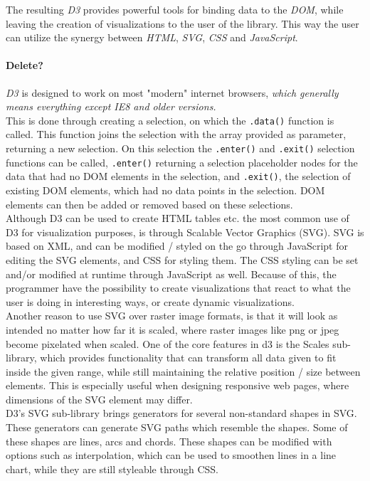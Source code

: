 \documentclass[Report.tex]{subfiles}
\begin{document}
	The resulting \emph{D3} provides powerful tools for binding data to the \emph{DOM}, while leaving the creation of visualizations to the user of the library. This way the user can utilize the synergy between \emph{HTML}, \emph{SVG}, \emph{CSS} and \emph{JavaScript}.
	
	\paragraph{Delete?\\}
	\emph{D3} is designed to work on most "modern" internet browsers, \textit{which generally means everything except IE8 and older versions.} \cite[Browser / Platform Support]{D3W}\\
	 This is done through creating a selection, on which the \texttt{.data()} function is called. This function joins the selection with the array provided as parameter, returning a new selection. On this selection the \texttt{.enter()} and \texttt{.exit()} selection functions can be called, \texttt{.enter()} returning a selection placeholder nodes for the data that had no DOM elements in the selection, and \texttt{.exit()}, the selection of existing DOM elements, which had no data points in the selection. DOM elements can then be added or removed based on these selections.\\
	Although D3 can be used to create HTML tables etc. the most common use of D3 for visualization purposes, is through Scalable Vector Graphics (SVG).
	SVG is based on XML, and can be modified / styled on the go through JavaScript for editing the SVG elements, and CSS for styling them. The CSS styling can be set and/or modified at runtime through JavaScript as well. Because of this, the programmer have the possibility to create visualizations that react to what the user is doing in interesting ways, or create dynamic visualizations.\\
	Another reason to use SVG over raster image formats, is that it will look as intended no matter how far it is scaled, where raster images like png or jpeg become pixelated when scaled.
	One of the core features in d3 is the Scales sub-library, which provides functionality that can transform all data given to fit inside the given range, while still maintaining the relative position / size between elements.
	This is especially useful when designing responsive web pages, where dimensions of the SVG element may differ.\\
	D3's SVG sub-library brings generators for several non-standard shapes in SVG. These generators can generate SVG paths which resemble the shapes. Some of these shapes are lines, arcs and chords. These shapes can be modified with options such as interpolation, which can be used to smoothen lines in a line chart, while they are still styleable through CSS.\\
	
\end{document}
